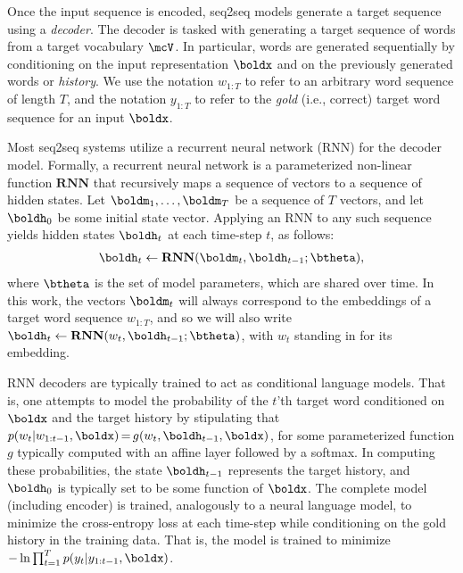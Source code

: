 \documentclass[11pt,letterpaper]{article}
\newcommand{\RNN}{\mathrm{\mathbf{RNN}}}
\newcommand{\pfx}[1]{\ensuremath{w_{1:{#1}}}}
\newcommand{\goldpfx}[1]{\ensuremath{y_{1:{#1}}}}
\newcommand{\niceq}{\ensuremath{\,{=}\,}}
\begin{document}
Once the input sequence is encoded, seq2seq models generate a target
sequence using a \textit{decoder}. The decoder is tasked with
generating a target sequence of words from a target vocabulary $\mcV$. In particular, words are generated sequentially by conditioning on the input representation $\boldx$ and on the previously generated words or \textit{history}. We use the notation $\pfx{T}$ to refer to an arbitrary word sequence of length $T$, and the notation $\goldpfx{T}$ to refer to the \textit{gold} (i.e., correct) target word sequence for an input $\boldx$. 

Most seq2seq systems utilize a recurrent neural network (RNN) for the decoder model. Formally, a recurrent neural network is a parameterized non-linear
function $\RNN$ that recursively maps a sequence of vectors to a
sequence of hidden states. Let $\boldm_1, \ldots, \boldm_T$ be a
sequence of $T$ vectors, and let $\boldh_0$ be some initial state
vector. Applying an RNN to any such sequence yields hidden states
$\boldh_t$ at each time-step $t$, as follows:
\begin{align*}
\boldh_t \gets \RNN(\boldm_t, \boldh_{t-1}; \btheta),
\end{align*}
where $\btheta$ is the set of model parameters, which are shared over time. In this work, the vectors $\boldm_t$ will always correspond to the embeddings of a target word sequence $\pfx{T}$, and so we will also write $\boldh_t \gets \RNN(w_t, \boldh_{t-1}; \btheta)$, with $w_t$ standing in for its embedding.
 










RNN decoders are typically trained to act as conditional language
models. That is, one attempts to model the probability of the $t$'th target
word conditioned on $\boldx$ and the target history by stipulating that $p(w_{t} | \pfx{t-1}, \boldx) \niceq g(w_{t},
\boldh_{t-1}, \boldx)$, for some parameterized function $g$ typically computed with an affine layer followed by a softmax. In computing these probabilities, the state $\boldh_{t-1}$ represents the target history, and $\boldh_0$ is typically set to be some function of $\boldx$. The complete model (including encoder) is trained,
analogously to a neural language model, to minimize the cross-entropy
loss at each time-step while conditioning on the gold history in the
training data. That is, the model is trained to minimize $-\ln \prod_{t=1}^{T} p(y_{t} |\goldpfx{t-1}, \boldx)$.
\end{document}
